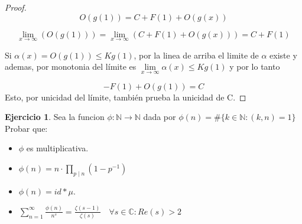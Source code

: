 \documentclass[12pt, a4paper]{article}
\newcommand{\naturales}{\mathbb{N}}
\newcommand{\complejos}{\mathbb{C}}
\theoremstyle{plain}
\theoremstyle{definition}
\newtheorem*{exercise}{Ejercicio}
\theoremstyle{remark}
\begin{document}
\begin{proof}
    \[
    O(g(1)) = C + F(1) + O(g(x))
    \]

    \[
    \lim_{x \to \infty}\left(O(g(1)) \right)
    = \lim_{x \to \infty} (C + F(1) + O(g(x)))
    = C + F(1)
    \]

    Si $\alpha(x) = O(g(1)) \leq Kg(1)$, por la linea de arriba el limite de $\alpha$ existe y ademas, 
    por monotonia del límite es $\lim\limits_{x \to \infty} \alpha(x) \leq Kg(1)$ y por lo tanto

    \[
    -F(1) + O(g(1)) = C
    \]
    Esto, por unicidad del límite, también prueba la unicidad de C.
    
\end{proof}

\newpage

\begin{exercise} Sea la funcion $\phi : \naturales \to \naturales$ dada por $\phi(n) = \#\{k\in \naturales : (k,n) = 1\}$
    Probar que:

\begin{itemize}
    \item[1)] $\phi$ es multiplicativa.
    \item[2)] $\phi(n) = n \cdot \prod_{p \mid n}(1-p^{-1}) $ 
    \item[3)] $\phi(n) = id * \mu $.
    \item[4)] $\sum_{n = 1}^{\infty}\frac{\phi(n)}{n^{s}} = \frac{\zeta(s-1)}{\zeta(s)} \quad 
    \forall s\in\complejos : Re(s)>2$
\end{itemize}
\end{exercise}
\end{document}
